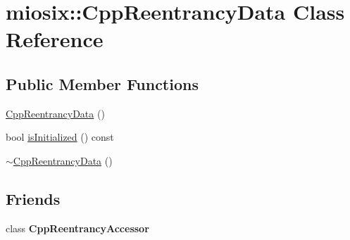 \hypertarget{classmiosix_1_1_cpp_reentrancy_data}{\section{miosix\-:\-:Cpp\-Reentrancy\-Data Class Reference}
\label{classmiosix_1_1_cpp_reentrancy_data}
}
\subsection*{Public Member Functions}
\begin{DoxyCompactItemize}
\item 
\hyperlink{classmiosix_1_1_cpp_reentrancy_data_a4b7c96f440fad3e5c97aba8660b7c8e7}{Cpp\-Reentrancy\-Data} ()
\item 
bool \hyperlink{classmiosix_1_1_cpp_reentrancy_data_ab5d4e9e384f85d521a21cfa2d5a3ab6d}{is\-Initialized} () const 
\item 
\hyperlink{classmiosix_1_1_cpp_reentrancy_data_adaa781fee904694346ab1287fcfb7fd5}{$\sim$\-Cpp\-Reentrancy\-Data} ()
\end{DoxyCompactItemize}
\subsection*{Friends}
\begin{DoxyCompactItemize}
\item 
\hypertarget{classmiosix_1_1_cpp_reentrancy_data_abec53b1d1198012c3c7d28ba495f8b8c}{class {\bfseries Cpp\-Reentrancy\-Accessor}}\label{classmiosix_1_1_cpp_reentrancy_data_abec53b1d1198012c3c7d28ba495f8b8c}

\end{DoxyCompactItemize}


